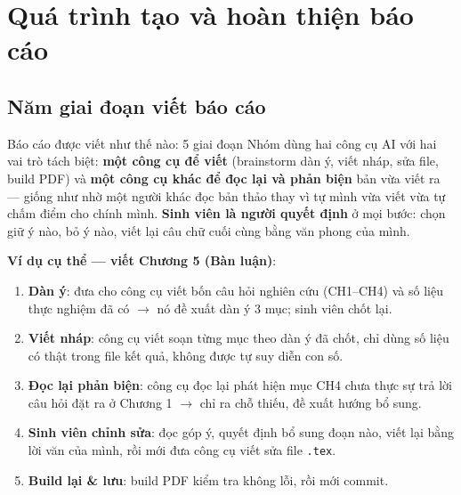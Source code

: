 
\section{Quá trình tạo và hoàn thiện báo cáo}

\subsection{Năm giai đoạn viết báo cáo}
\begin{frame}{Báo cáo được viết như thế nào: 5 giai đoạn}
  \footnotesize
  Nhóm dùng hai công cụ AI với hai vai trò tách biệt: \textbf{một công cụ để viết}
  (brainstorm dàn ý, viết nháp, sửa file, build PDF) và \textbf{một công cụ khác để
  đọc lại và phản biện} bản vừa viết ra --- giống như nhờ một người khác đọc bản
  thảo thay vì tự mình vừa viết vừa tự chấm điểm cho chính mình. \textbf{Sinh viên
  là người quyết định} ở mọi bước: chọn giữ ý nào, bỏ ý nào, viết lại câu chữ cuối
  cùng bằng văn phong của mình.

  \vspace{0.1cm}
  \textbf{Ví dụ cụ thể --- viết Chương 5 (Bàn luận)}:
  \begin{enumerate}\scriptsize\setlength{\itemsep}{1.5pt}
    \item \textbf{Dàn ý}: đưa cho công cụ viết bốn câu hỏi nghiên cứu (CH1--CH4) và
      số liệu thực nghiệm đã có $\rightarrow$ nó đề xuất dàn ý 3 mục; sinh viên chốt lại.
    \item \textbf{Viết nháp}: công cụ viết soạn từng mục theo dàn ý đã chốt, chỉ dùng
      số liệu có thật trong file kết quả, không được tự suy diễn con số.
    \item \textbf{Đọc lại phản biện}: công cụ đọc lại phát hiện mục CH4 chưa thực sự trả
      lời câu hỏi đặt ra ở Chương 1 $\rightarrow$ chỉ ra chỗ thiếu, đề xuất hướng bổ sung.
    \item \textbf{Sinh viên chỉnh sửa}: đọc góp ý, quyết định bổ sung đoạn nào, viết lại
      bằng lời văn của mình, rồi mới đưa công cụ viết sửa file \texttt{.tex}.
    \item \textbf{Build lại \& lưu}: build PDF kiểm tra không lỗi, rồi mới commit.
  \end{enumerate}
\end{frame}

